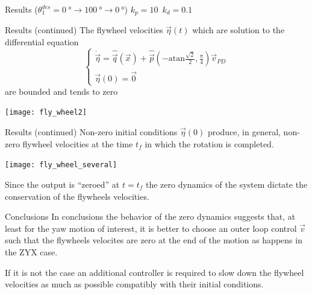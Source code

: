 \begin{frame}{Results ($\theta_1^{des} = \SI{0}{\degree}\rightarrow \SI{100}{\degree}\rightarrow \SI{0}{\degree}$)
    \quad $k_p = 10 \enspace k_d = 0.1$ \hfill \color{dgreen}{ZYX}}
\end{frame}

\begin{frame}{Results (continued) \hfill \color{dgreen}{ZYX}}
  The flywheel velocities $\vec{\eta}(t)$ which are
  solution to the differential equation
  \[
  \begin{cases}
    \dot{\vec{\eta}} = \hat{\vec{q}}(\vec{x}) + \hat{\vec{p}}\left(-\mathrm{atan}\frac{\sqrt{2}}{2},\frac{\pi}{4}\right)\vec{v}_{PD}\\
    \vec{\eta}(0) = \vec{0}
  \end{cases}
  \]
  are bounded and tends to zero
  \par
  \centering
  \texttt{[image: fly\_wheel2]}
\end{frame}

\begin{frame}{Results (continued) \hfill \color{dgreen}{ZYX}}
  Non-zero initial conditions $\vec{\eta}(0)$ produce, in general,
  non-zero flywheel velocities at the time $t_f$ in which the
  rotation is completed.
  \par
  \centering
  \texttt{[image: fly\_wheel\_several]}
  \par
  Since the output is ``zeroed'' at $t=t_f$ the zero dynamics of the system
  dictate the conservation of the flywheels velocities.
\end{frame}

\begin{frame}{Conclusions}
  In conclusions the behavior of the zero dynamics suggests that,
  at least for the yaw motion of interest, it is better to choose an outer loop control $\vec{v}$
  such that the flywheels velocites are zero at the end of the motion
  as happens in the \textcolor{dgreen}{ZYX} case.
  \par
  If it is not the case an additional controller is required to slow down the flywheel
  velocities as much as possible compatibly with their initial conditions.
\end{frame}

